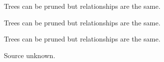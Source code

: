 \documentclass[t]{beamer}
\begin{document}
{
\begin{frame}[b]{Trees can be pruned but relationships are the same.}

\end{frame}
}

{
\begin{frame}[b]{Trees can be pruned but relationships are the same.}

\end{frame}
}
{
\begin{frame}[b]{Trees can be pruned but relationships are the same.}

\end{frame}
}

{
\begin{frame}[b]

\hfill\tiny Source unknown.
\end{frame}
}
%

%
%
\end{document}
